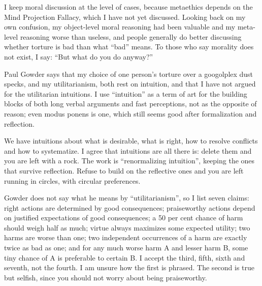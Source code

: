 
I keep moral discussion at the level of cases, because metaethics depends on the Mind Projection Fallacy, which I have not yet discussed. Looking back on my own confusion, my object-level moral reasoning had been valuable and my meta-level reasoning worse than useless, and people generally do better discussing whether torture is bad than what ``bad'' means. To those who say morality does not exist, I say: ``But what do you do anyway?'' 

Paul Gowder says that my choice of one person's torture over a googolplex dust specks, and my utilitarianism, both rest on intuition, and that I have not argued for the utilitarian intuitions.  I use ``intuition'' as a term of art for the building blocks of both long verbal arguments and fast perceptions, not as the opposite of reason; even modus ponens is one, which still seems good after formalization and reflection.

We have intuitions about what is desirable, what is right, how to resolve conflicts and how to systematize. I agree that intuitions are all there is: delete them and you are left with a rock. The work is ``renormalizing intuition'', keeping the ones that survive reflection.  Refuse to build on the reflective ones and you are left running in circles, with circular preferences. 

Gowder does not say what he means by ``utilitarianism'', so I list seven claims: right actions are determined by good consequences; praiseworthy actions depend on justified expectations of good consequences; a 50 per cent chance of harm should weigh half as much; virtue always maximizes some expected utility; two harms are worse than one; two independent occurrences of a harm are exactly twice as bad as one; and for any much worse harm A and lesser harm B, some tiny chance of A is preferable to certain B. I accept the third, fifth, sixth and seventh, not the fourth. I am unsure how the first is phrased. The second is true but selfish, since you should not worry about being praiseworthy.

